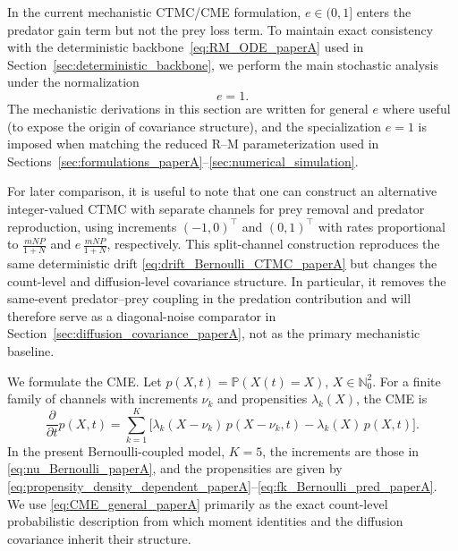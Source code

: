 \documentclass[pdflatex,sn-mathphys-ay]{sn-jnl}
\theoremstyle{thmstyleone}
\theoremstyle{definition}
\theoremstyle{remark}
\begin{document}
In the current mechanistic CTMC/CME formulation, \(e\in(0,1]\) enters the predator gain term but not the prey loss term. 
To maintain exact consistency with the deterministic backbone~\eqref{eq:RM_ODE_paperA} used in Section~\ref{sec:deterministic_backbone}, we perform the main stochastic analysis under the normalization
\[
e=1.
\]
The mechanistic derivations in this section are written for general \(e\) where useful (to expose the origin of covariance structure), and the specialization \(e=1\) is imposed when matching the reduced R--M parameterization used in Sections~\ref{sec:formulations_paperA}--\ref{sec:numerical_simulation}.

For later comparison, it is useful to note that one can construct an alternative integer-valued CTMC with separate channels for prey removal and predator reproduction, using increments \(({-1},0)^\top\) and \((0,1)^\top\) with rates proportional to \(\frac{mNP}{1+N}\) and \(e\,\frac{mNP}{1+N}\), respectively. This split-channel construction reproduces the same deterministic drift \eqref{eq:drift_Bernoulli_CTMC_paperA} but changes the count-level and diffusion-level covariance structure. In particular, it removes the same-event predator--prey coupling in the predation contribution and will therefore serve as a diagonal-noise comparator in Section~\ref{sec:diffusion_covariance_paperA}, not as the primary mechanistic baseline.

We formulate the CME.
Let \(p(X,t)=\mathbb P(X(t)=X)\), \(X\in\mathbb N_0^2\). For a finite family of channels with increments \(\nu_k\) and propensities \(\lambda_k(X)\), the CME is
\begin{equation}
\label{eq:CME_general_paperA}
\frac{\partial}{\partial t}p(X,t)
=
\sum_{k=1}^{K}
\Big[
\lambda_k(X-\nu_k)\,p(X-\nu_k,t)
-
\lambda_k(X)\,p(X,t)
\Big].
\end{equation}
In the present Bernoulli-coupled model, \(K=5\), the increments are those in \eqref{eq:nu_Bernoulli_paperA}, and the propensities are given by \eqref{eq:propensity_density_dependent_paperA}--\eqref{eq:fk_Bernoulli_pred_paperA}. We use \eqref{eq:CME_general_paperA} primarily as the exact count-level probabilistic description from which moment identities and the diffusion covariance inherit their structure.
\end{document}
